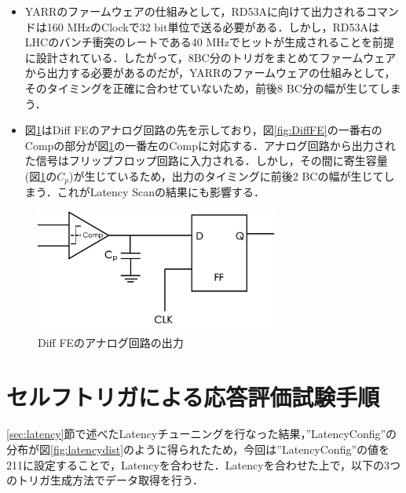 \begin{itemize}
\item YARRのファームウェアの仕組みとして，RD53Aに向けて出力されるコマンドは160 $\mathrm{MHz}$のClockで32 $\mathrm{bit}$単位で送る必要がある．しかし，RD53AはLHCのバンチ衝突のレートである40 $\mathrm{MHz}$でヒットが生成されることを前提に設計されている．したがって，8BC分のトリガをまとめてファームウェアから出力する必要があるのだが，YARRのファームウェアの仕組みとして，そのタイミングを正確に合わせていないため，前後8 BC分の幅が生じてしまう．
  
\item 図\ref{fig:analogop}はDiff FEのアナログ回路の先を示しており，図\ref{fig:DiffFE}の一番右のCompの部分が図\ref{fig:analogop}の一番左のCompに対応する．アナログ回路から出力された信号はフリップフロップ回路に入力される．しかし，その間に寄生容量(図\ref{fig:analogop}の$C_p$)が生じているため，出力のタイミングに前後2 BCの幅が生じてしまう．これがLatency Scanの結果にも影響する．


\end{itemize}

\begin{figure}[h]
  \centering
  \includegraphics[width=8cm]{./figure/analogop.png}
  \caption{Diff FEのアナログ回路の出力}
  \label{fig:analogop}
\end{figure}



\section{セルフトリガによる応答評価試験手順}
\label{sec:selfhow}
\ref{sec:latency}節で述べたLatencyチューニングを行なった結果，''LatencyConfig''の分布が図\ref{fig:latencydist}のように得られたため，今回は''LatencyConfig''の値を211に設定することで，Latencyを合わせた．Latencyを合わせた上で，以下の3つのトリガ生成方法でデータ取得を行う．

